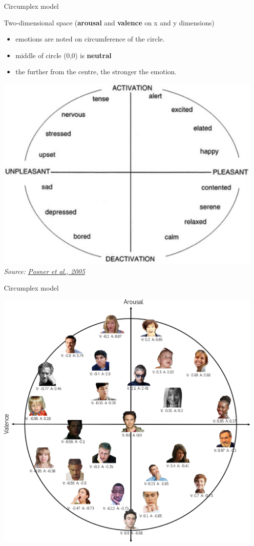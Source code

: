 \documentclass[compress]{beamer}
\newcommand{\source}[2]{{\tiny\it Source: \href{#1}{#2}}}
\begin{document}
{
\begin{frame}{Circumplex model}

Two-dimensional space (\textbf{arousal} and \textbf{valence} on x and y
dimensions)

\begin{itemize}

\item emotions are noted on circumference of the circle.
\item middle of circle (0,0) is \textbf{neutral}
\item the further from the centre, the stronger the emotion.
\end{itemize}

    \begin{center}
        \includegraphics[width=0.55\linewidth]{circumplex}
        \source{http://www.ncbi.nlm.nih.gov/pmc/articles/PMC2367156/}{Posner
et al., 2005}
    \end{center}
\end{frame}
}

{
\begin{frame}{Circumplex model}
    \begin{center}
        \includegraphics[width=0.65\linewidth]{AffectNet_circumplex.png}
    \end{center}
\end{frame}
}
\end{document}
